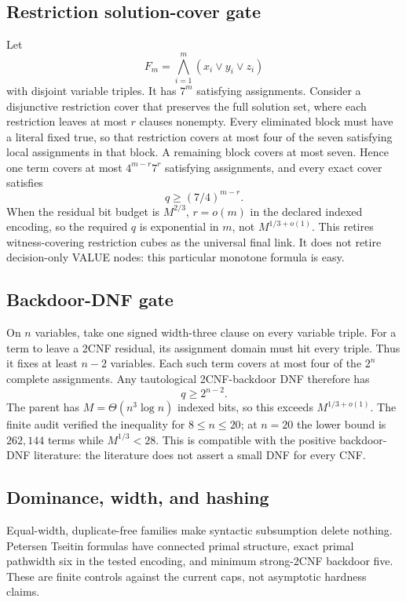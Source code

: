\documentclass[11pt]{article}
\begin{document}
\subsection{Restriction solution-cover gate}
Let
\[
 F_m=\bigwedge_{i=1}^m(x_i\vee y_i\vee z_i)
\]
with disjoint variable triples.  It has $7^m$ satisfying assignments.  Consider
a disjunctive restriction cover that preserves the full solution set, where
each restriction leaves at most $r$ clauses nonempty.  Every eliminated block
must have a literal fixed true, so that restriction covers at most four of the
seven satisfying local assignments in that block.  A remaining block covers
at most seven.  Hence one term covers at most
$4^{m-r}7^r$ satisfying assignments, and every exact cover satisfies
\[
 \boxed{q\ge (7/4)^{m-r}.}
\]
When the residual bit budget is $M^{2/3}$, $r=o(m)$ in the declared indexed
encoding, so the required $q$ is exponential in $m$, not $M^{1/3+o(1)}$.
This retires witness-covering restriction cubes as the universal final link.
It does not retire decision-only VALUE nodes: this particular monotone formula
is easy.

\subsection{Backdoor-DNF gate}
On $n$ variables, take one signed width-three clause on every variable triple.
For a term to leave a 2CNF residual, its assignment domain must hit every
triple.  Thus it fixes at least $n-2$ variables.  Each such term covers at most
four of the $2^n$ complete assignments.  Any tautological 2CNF-backdoor DNF
therefore has
\[
 \boxed{q\ge2^{n-2}.}
\]
The parent has $M=\Theta(n^3\log n)$ indexed bits, so this exceeds
$M^{1/3+o(1)}$.  The finite audit verified the inequality for $8\le n\le20$;
at $n=20$ the lower bound is $262{,}144$ terms while $M^{1/3}<28$.
This is compatible with the positive backdoor-DNF literature: the literature
does not assert a small DNF for every CNF.

\subsection{Dominance, width, and hashing}
Equal-width, duplicate-free families make syntactic subsumption delete nothing.
Petersen Tseitin formulas have connected primal structure, exact primal
pathwidth six in the tested encoding, and minimum strong-2CNF backdoor five.
These are finite controls against the current caps, not asymptotic hardness
claims.
\end{document}
